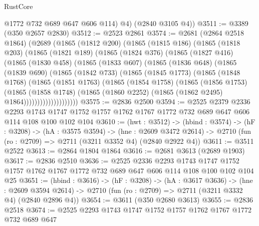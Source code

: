 \begin{lexlean}{RustCore}
\begin{coremodule}
          @1772
          @732
          @689
          @647
          @606
          @114)
        @4)
      (@2840 @3105 @4))
@3511 := @3389 (@350 @2657 @2830)
@3512 := @2523 @2861
@3574 := @2681
    (@2864 @2518 @1864)
    (@2689
      (@1865
        (@1812 @200)
        (@1865
          (@1815 @186)
          (@1865
            (@1818 @203)
            (@1865
              (@1821 @189)
              (@1865
                (@1824 @376)
                (@1865
                  (@1827 @416)
                  (@1865
                    (@1830 @458)
                    (@1865
                      (@1833 @607)
                      (@1865
                        (@1836 @648)
                        (@1865
                          (@1839 @690)
                          (@1865
                            (@1842 @733)
                            (@1865
                              (@1845 @1773)
                              (@1865
                                (@1848 @1768)
                                (@1865
                                  (@1851 @1763)
                                  (@1865
                                    (@1854 @1758)
                                    (@1865
                                      (@1856 @1753)
                                      (@1865
                                        (@1858 @1748)
                                        (@1865
                                          (@1860 @2252)
                                          (@1865 (@1862 @2495) @1864))))))))))))))))))))
@3575 := @2836 @2500
@3594 := @2525
    @2379
    @2336
    @2293
    @1743
    @1747
    @1752
    @1757
    @1762
    @1767
    @1772
    @732
    @689
    @647
    @606
    @114
    @108
    @100
    @102
    @104
@3610 := (hwt : @3512) ->
  (hbind : @3574) ->
  (hF : @3208) ->
  (hA : @3575 @3594) ->
  (hne : @2609 @3472 @2614) -> @2710 (fun (ro : @2709) => @2711 (@3211 @3352 @4) (@2840 @2922 @4))
@3611 := @3511 @2522
@3613 := @2864 @1804 @1864
@3616 := @2681 @3613 (@2689 @1903)
@3617 := @2836 @2510
@3636 := @2525
    @2336
    @2293
    @1743
    @1747
    @1752
    @1757
    @1762
    @1767
    @1772
    @732
    @689
    @647
    @606
    @114
    @108
    @100
    @102
    @104
    @25
@3651 := (hbind : @3616) ->
  (hF : @3208) ->
  (hA : @3617 @3636) ->
  (hne : @2609 @3594 @2614) -> @2710 (fun (ro : @2709) => @2711 (@3211 @3332 @4) (@2840 @2896 @4))
@3654 := @3611 (@350 @2680 @3613)
@3655 := @2836 @2518
@3674 := @2525
    @2293
    @1743
    @1747
    @1752
    @1757
    @1762
    @1767
    @1772
    @732
    @689
    @647

\end{coremodule}
\end{lexlean}
